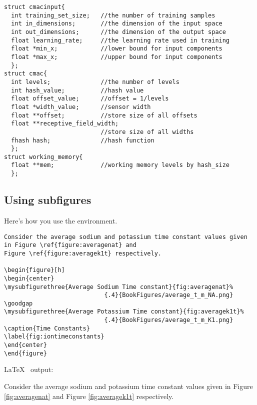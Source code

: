 \documentclass[11pt]{SelfArxOneColBMN}
\newcommand{\goodgap}{
  \hspace{\subfigtopskip}
  \hspace{\subfigbottomskip}}
\begin{document}
\singlespacing
\begin{lstlisting}
struct cmacinput{ 
  int training_set_size;   //the number of training samples 
  int in_dimensions;       //the dimension of the input space 
  int out_dimensions;      //the dimension of the output space 
  float learning_rate;     //the learning rate used in training 
  float *min_x;            //lower bound for input components  
  float *max_x;            //upper bound for input components 
  }; 
struct cmac{ 
  int levels;              //the number of levels  
  int hash_value;          //hash value 
  float offset_value;      //offset = 1/levels 
  float *width_value;      //sensor width 
  float **offset;          //store size of all offsets 
  float **receptive_field_width; 
                           //store size of all widths 
  fhash hash;              //hash function 
  }; 
struct working_memory{      
  float **mem;             //working memory levels by hash_size 
  };  
\end{lstlisting}
\onehalfspacing

\subsection{Using subfigures}

\noindent
Here's how you use the  environment.

\singlespacing
{}
\begin{lstlisting}
Consider the average sodium and potassium time constant values given in Figure \ref{figure:averagenat} and
Figure \ref{figure:averagek1t} respectively.

\begin{figure}[h]
\begin{center}
\mysubfigurethree{Average Sodium Time constant}{fig:averagenat}%
                            {.4}{BookFigures/average_t_m_NA.png}
\goodgap
\mysubfigurethree{Average Potassium Time constant}{fig:averagek1t}%
                            {.4}{BookFigures/average_t_m_K1.png}
\caption{Time Constants}
\label{fig:iontimeconstants}
\end{center}
\end{figure}
\end{lstlisting}
\onehalfspacing
\lstset{fancyvrb=false}

\noindent
\LaTeX~ output:

Consider the average sodium and potassium time constant values given in Figure \ref{fig:averagenat} and
Figure \ref{fig:averagek1t} respectively.
\end{document}
